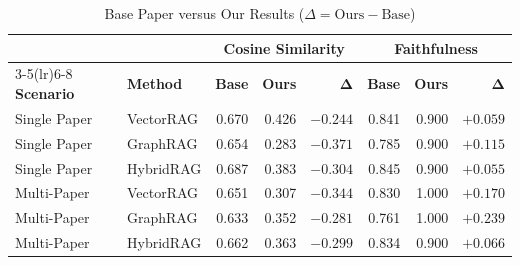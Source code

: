 \documentclass[conference]{IEEEtran}
\begin{document}
\begin{table}[t]
\caption{Base Paper versus Our Results ($\Delta = \text{Ours} - \text{Base}$)}
\label{tab:compare}
\centering
\footnotesize
\setlength{\tabcolsep}{2.5pt}
\begin{tabular}{llrrrrrr}
\toprule
& & \multicolumn{3}{c}{\textbf{Cosine Similarity}} & \multicolumn{3}{c}{\textbf{Faithfulness}} \\
\cmidrule(lr){3-5}\cmidrule(lr){6-8}
\textbf{Scenario} & \textbf{Method} & \textbf{Base} & \textbf{Ours} & $\mathbf{\Delta}$ & \textbf{Base} & \textbf{Ours} & $\mathbf{\Delta}$ \\
\midrule
Single Paper & VectorRAG & 0.670 & 0.426 & $-0.244$ & 0.841 & 0.900 & $+0.059$ \\
Single Paper & GraphRAG  & 0.654 & 0.283 & $-0.371$ & 0.785 & 0.900 & $+0.115$ \\
Single Paper & HybridRAG & 0.687 & 0.383 & $-0.304$ & 0.845 & 0.900 & $+0.055$ \\
\midrule
Multi-Paper  & VectorRAG & 0.651 & 0.307 & $-0.344$ & 0.830 & 1.000 & $+0.170$ \\
Multi-Paper  & GraphRAG  & 0.633 & 0.352 & $-0.281$ & 0.761 & 1.000 & $+0.239$ \\
Multi-Paper  & HybridRAG & 0.662 & 0.363 & $-0.299$ & 0.834 & 0.900 & $+0.066$ \\
\bottomrule
\end{tabular}
\end{table}
\end{document}

